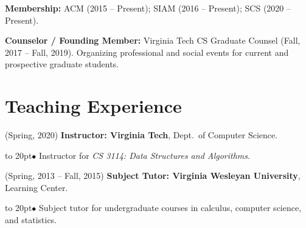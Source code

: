 \documentclass[12pt]{article}
\def\bullitem{\par\hangindent=15pt \hangafter=1
\noindent\hbox to 20pt{\hfil$\bullet$\hfil}\ignorespaces}
\begin{document}
\textbf{Membership:}
ACM (2015 -- Present); SIAM (2016 -- Present); SCS (2020 -- Present).

\textbf{Counselor / Founding Member:} Virginia Tech CS Graduate Counsel 
(Fall, 2017 -- Fall, 2019).
Organizing professional and social events for
current and prospective graduate students.

\section*{Teaching Experience}

\hangindent=0.3in
(Spring, 2020)
\textbf{Instructor: Virginia Tech}, Dept.\ of Computer Science.
\bullitem
Instructor for {\it CS 3114: Data Structures and Algorithms}.

\medskip

\hangindent=0.3in
(Spring, 2013 -- Fall, 2015)
\textbf{Subject Tutor: Virginia Wesleyan University},
Learning Center.
\bullitem
Subject tutor for undergraduate courses in calculus, computer science, and
statistics.
\end{document}
